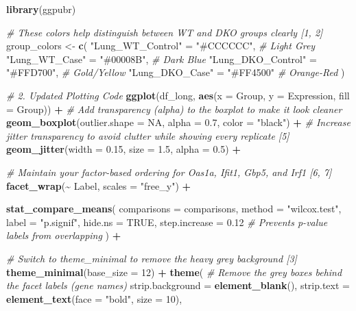 \documentclass[
]{article}
\newenvironment{Shaded}{\begin{snugshade}}{\end{snugshade}}
\newcommand{\AttributeTok}[1]{\textcolor[rgb]{0.13,0.29,0.53}{#1}}
\newcommand{\CommentTok}[1]{\textcolor[rgb]{0.56,0.35,0.01}{\textit{#1}}}
\newcommand{\ConstantTok}[1]{\textcolor[rgb]{0.56,0.35,0.01}{#1}}
\newcommand{\DecValTok}[1]{\textcolor[rgb]{0.00,0.00,0.81}{#1}}
\newcommand{\FloatTok}[1]{\textcolor[rgb]{0.00,0.00,0.81}{#1}}
\newcommand{\FunctionTok}[1]{\textcolor[rgb]{0.13,0.29,0.53}{\textbf{#1}}}
\newcommand{\NormalTok}[1]{#1}
\newcommand{\OtherTok}[1]{\textcolor[rgb]{0.56,0.35,0.01}{#1}}
\newcommand{\SpecialCharTok}[1]{\textcolor[rgb]{0.81,0.36,0.00}{\textbf{#1}}}
\newcommand{\StringTok}[1]{\textcolor[rgb]{0.31,0.60,0.02}{#1}}
\begin{document}
\begin{Shaded}
\begin{Highlighting}[]
\FunctionTok{library}\NormalTok{(ggpubr)}

\CommentTok{\# These colors help distinguish between WT and DKO groups clearly [1, 2]}
\NormalTok{group\_colors }\OtherTok{\textless{}{-}} \FunctionTok{c}\NormalTok{(}
  \StringTok{"Lung\_WT\_Control"}  \OtherTok{=} \StringTok{"\#CCCCCC"}\NormalTok{, }\CommentTok{\# Light Grey}
  \StringTok{"Lung\_WT\_Case"}     \OtherTok{=} \StringTok{"\#00008B"}\NormalTok{, }\CommentTok{\# Dark Blue}
  \StringTok{"Lung\_DKO\_Control"} \OtherTok{=} \StringTok{"\#FFD700"}\NormalTok{, }\CommentTok{\# Gold/Yellow}
  \StringTok{"Lung\_DKO\_Case"}    \OtherTok{=} \StringTok{"\#FF4500"}  \CommentTok{\# Orange{-}Red}
\NormalTok{)}

\CommentTok{\# 2. Updated Plotting Code}
\FunctionTok{ggplot}\NormalTok{(df\_long, }\FunctionTok{aes}\NormalTok{(}\AttributeTok{x =}\NormalTok{ Group, }\AttributeTok{y =}\NormalTok{ Expression, }\AttributeTok{fill =}\NormalTok{ Group)) }\SpecialCharTok{+}
  \CommentTok{\# Add transparency (alpha) to the boxplot to make it look cleaner}
  \FunctionTok{geom\_boxplot}\NormalTok{(}\AttributeTok{outlier.shape =} \ConstantTok{NA}\NormalTok{, }\AttributeTok{alpha =} \FloatTok{0.7}\NormalTok{, }\AttributeTok{color =} \StringTok{"black"}\NormalTok{) }\SpecialCharTok{+} 
  \CommentTok{\# Increase jitter transparency to avoid clutter while showing every replicate [5]}
  \FunctionTok{geom\_jitter}\NormalTok{(}\AttributeTok{width =} \FloatTok{0.15}\NormalTok{, }\AttributeTok{size =} \FloatTok{1.5}\NormalTok{, }\AttributeTok{alpha =} \FloatTok{0.5}\NormalTok{) }\SpecialCharTok{+}

  \CommentTok{\# Maintain your factor{-}based ordering for Oas1a, Ifit1, Gbp5, and Irf1 [6, 7]}
  \FunctionTok{facet\_wrap}\NormalTok{(}\SpecialCharTok{\textasciitilde{}}\NormalTok{ Label, }\AttributeTok{scales =} \StringTok{"free\_y"}\NormalTok{) }\SpecialCharTok{+}

  \FunctionTok{stat\_compare\_means}\NormalTok{(}
    \AttributeTok{comparisons =}\NormalTok{ comparisons,}
    \AttributeTok{method =} \StringTok{"wilcox.test"}\NormalTok{,}
    \AttributeTok{label =} \StringTok{"p.signif"}\NormalTok{,}
    \AttributeTok{hide.ns =} \ConstantTok{TRUE}\NormalTok{,}
    \AttributeTok{step.increase =} \FloatTok{0.12} \CommentTok{\# Prevents p{-}value labels from overlapping}
\NormalTok{  ) }\SpecialCharTok{+}

  \CommentTok{\# Switch to theme\_minimal to remove the heavy grey background [3]}
  \FunctionTok{theme\_minimal}\NormalTok{(}\AttributeTok{base\_size =} \DecValTok{12}\NormalTok{) }\SpecialCharTok{+} 
  \FunctionTok{theme}\NormalTok{(}
    \CommentTok{\# Remove the grey boxes behind the facet labels (gene names)}
    \AttributeTok{strip.background =} \FunctionTok{element\_blank}\NormalTok{(), }
    \AttributeTok{strip.text =} \FunctionTok{element\_text}\NormalTok{(}\AttributeTok{face =} \StringTok{"bold"}\NormalTok{, }\AttributeTok{size =} \DecValTok{10}\NormalTok{),}
    

\end{Highlighting}
\end{Shaded}
\end{document}
